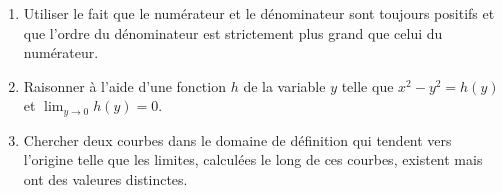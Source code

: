 {\begin{enumerate}
{\begin{enumerate}
\item Utiliser le fait que le num\'erateur et le d\'enominateur sont toujours positifs
et que l'ordre du d\'enominateur est strictement plus grand que celui du num\'erateur.

\item
Raisonner \`a l'aide d'une fonction $h$ de la variable $y$
telle que $x^2-y^2=h(y)$ et $\lim_{y \to 0} h(y)=0$.

\item Chercher deux courbes dans
le domaine de d\'efinition
qui tendent vers l'origine
telle que les limites, calcul\'ees le long de ces courbes,
existent mais ont des valeures distinctes.

\end{enumerate}}
\end{enumerate}
}
